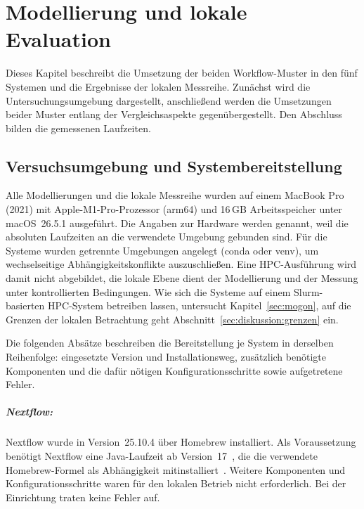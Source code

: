 
\lstset{breaklines=true, breakatwhitespace=false}

\chapter{Modellierung und lokale Evaluation}
\label{sec:lokal}

Dieses Kapitel beschreibt die Umsetzung der beiden Workflow-Muster
in den fünf Systemen und die Ergebnisse der lokalen Messreihe.
Zunächst wird die Untersuchungsumgebung dargestellt, anschließend
werden die Umsetzungen beider Muster entlang der Vergleichsaspekte
gegenübergestellt. Den Abschluss bilden die gemessenen Laufzeiten.

\section{Versuchsumgebung und Systembereitstellung}
\label{sec:lokal:umgebung}

Alle Modellierungen und die lokale Messreihe wurden auf einem MacBook
Pro (2021) mit Apple-M1-Pro-Prozessor (arm64) und 16\,GB
Arbeitsspeicher unter macOS~26.5.1 ausgeführt. Die Angaben zur Hardware werden genannt, weil die absoluten Laufzeiten an die verwendete Umgebung gebunden sind. Für die Systeme wurden getrennte Umgebungen angelegt (conda oder venv), um wechselseitige Abhängigkeitskonflikte auszuschließen. Eine HPC-Ausführung wird damit nicht abgebildet, die lokale Ebene
dient der Modellierung und der Messung unter kontrollierten
Bedingungen. Wie sich die
Systeme auf einem Slurm-basierten HPC-System betreiben lassen,
untersucht Kapitel~\ref{sec:mogon}, auf die Grenzen der lokalen
Betrachtung geht Abschnitt~\ref{sec:diskussion:grenzen} ein.

Die folgenden Absätze beschreiben die Bereitstellung je System in
derselben Reihenfolge: eingesetzte Version und Installationsweg,
zusätzlich benötigte Komponenten und die dafür nötigen
Konfigurationsschritte sowie aufgetretene Fehler.

\paragraph{Nextflow:} Nextflow wurde in Version~25.10.4 über Homebrew
installiert. Als Voraussetzung benötigt Nextflow eine Java-Laufzeit
ab Version~17~\cite{nextflowdocs-install}, die die verwendete
Homebrew-Formel als Abhängigkeit mitinstalliert~\cite{brewnextflow}.
Weitere Komponenten und Konfigurationsschritte waren für den lokalen
Betrieb nicht erforderlich. Bei der Einrichtung traten keine Fehler
auf.

